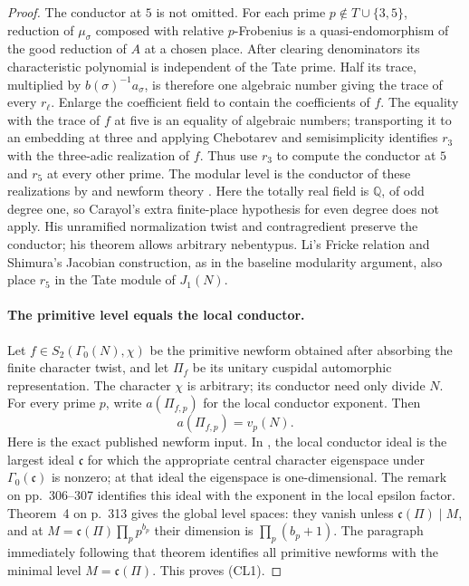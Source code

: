 \begin{proof}
The conductor at $5$ is not omitted. For each prime
$p\notin T\cup\{3,5\}$, reduction of $\mu_\sigma$ composed with
relative $p$-Frobenius is a quasi-endomorphism of the good reduction
of $A$ at a chosen place. After clearing denominators its characteristic
polynomial is independent of the Tate prime. Half its trace, multiplied
by $b(\sigma)^{-1}a_\sigma$, is therefore one algebraic number giving
the trace of every $r_\ell$. Enlarge the coefficient field to contain
the coefficients of $f$. The equality with the trace of $f$ at five
is an equality of algebraic numbers; transporting it to an embedding
at three and applying Chebotarev and semisimplicity identifies $r_3$
with the three-adic realization of $f$. Thus use $r_3$ to compute the
conductor at $5$ and $r_5$ at every other prime. The modular level is
the conductor of these realizations by
\cite[\S\S0.3--0.7, Theorem A, pp.~409--411]{carayol}
and newform theory \cite[Theorems 1 and 4]{casselman}.
Here the totally real field is $\mathbb Q$, of odd degree one, so
Carayol's extra finite-place hypothesis for even degree does not apply.
His unramified normalization twist and contragredient preserve the
conductor; his theorem allows arbitrary nebentypus.
Li's Fricke relation and Shimura's
Jacobian construction, as in the baseline modularity argument, also
place $r_5$ in the Tate module of $J_1(N)$.

\paragraph{The primitive level equals the local conductor.}
Let $f\in S_2(\Gamma_0(N),\chi)$ be the primitive newform obtained
after absorbing the finite character twist, and let $\Pi_f$ be its
unitary cuspidal automorphic representation. The character $\chi$
is arbitrary; its conductor need only divide $N$.
For every prime $p$, write $a(\Pi_{f,p})$ for the local conductor
exponent. Then
\[
 a(\Pi_{f,p})=v_p(N).
\tag{CL1}
\]
Here is the exact published newform input. In
\cite[Theorem~1, p.~302]{casselman}, the local conductor ideal is
the largest ideal $\mathfrak c$ for which the appropriate central
character eigenspace under $\Gamma_0(\mathfrak c)$ is nonzero;
at that ideal the eigenspace is one-dimensional. The remark on
pp.~306--307 identifies this ideal with the exponent in the local
epsilon factor. Theorem~4 on p.~313 gives the global level spaces:
they vanish unless $\mathfrak c(\Pi)\mid M$, and at
$M=\mathfrak c(\Pi)\prod_p p^{b_p}$ their dimension is
$\prod_p(b_p+1)$. The paragraph immediately following that theorem
identifies all primitive newforms with the minimal level
$M=\mathfrak c(\Pi)$. This proves (CL1).


\end{proof}
